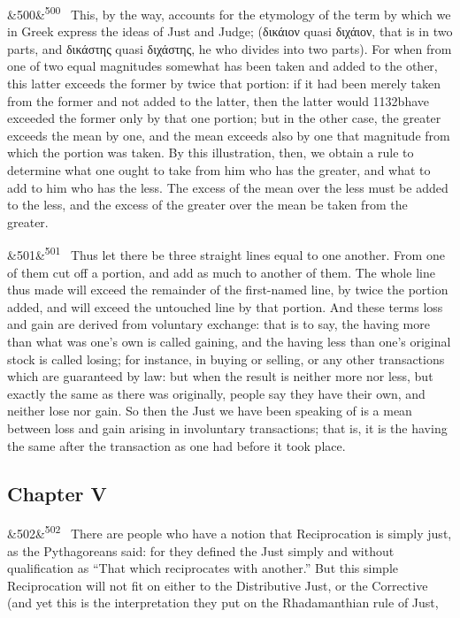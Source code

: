 \documentclass[12pt]{article}
\newcommand{\para}[1][]{\par\noindent\ifx&#1&\else\textsuperscript{\footnotesize #1}~\fi}
\begin{document}
\para[500] This, by the way, accounts for the etymology of the term by which we in Greek express the ideas of Just and Judge; (δικάιον quasi διχάιον, that is in two parts, and δικάστης quasi διχάστης, he who divides into two parts). For when from one of two equal magnitudes somewhat has been taken and added to the other, this latter exceeds the former by twice that portion: if it had been merely taken from the former and not added to the latter, then the latter would 1132bhave exceeded the former only by that one portion; but in the other case, the greater exceeds the mean by one, and the mean exceeds also by one that magnitude from which the portion was taken. By this illustration, then, we obtain a rule to determine what one ought to take from him who has the greater, and what to add to him who has the less. The excess of the mean over the less must be added to the less, and the excess of the greater over the mean be taken from the greater.

\para[501] Thus let there be three straight lines equal to one another. From one of them cut off a portion, and add as much to another of them. The whole line thus made will exceed the remainder of the first-named line, by twice the portion added, and will exceed the untouched line by that portion. And these terms loss and gain are derived from voluntary exchange: that is to say, the having more than what was one's own is called gaining, and the having less than one's original stock is called losing; for instance, in buying or selling, or any other transactions which are guaranteed by law: but when the result is neither more nor less, but exactly the same as there was originally, people say they have their own, and neither lose nor gain. So then the Just we have been speaking of is a mean between loss and gain arising in involuntary transactions; that is, it is the having the same after the transaction as one had before it took place.

\subsection*{Chapter V}

\para[502] There are people who have a notion that Reciprocation is simply just, as the Pythagoreans said: for they defined the Just simply and without qualification as “That which reciprocates with another.” But this simple Reciprocation will not fit on either to the Distributive Just, or the Corrective (and yet this is the interpretation they put on the Rhadamanthian rule of Just,
\end{document}

